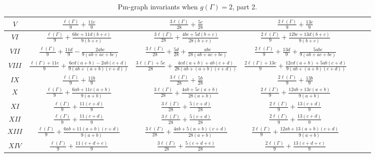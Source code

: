\documentclass[12pt]{amsart}
\theoremstyle{example}
\theoremstyle{definition}
\theoremstyle{notation}
\begin{document}
\begin{table}
\begin{center}
\begin{tabular}{|c|c|c|c|c|c|c|}
 \hline
$V$ {\rule{0pt}{2.6ex}} {\rule[-1.2ex]{0pt}{0ex}} &  $\frac{\ell ({\Gamma})}{9}+\frac{11c}{9}$ & $\frac{3{\ell ({\Gamma})}}{28}+\frac{5c}{28}$ & $\frac{2{\ell ({\Gamma})}}{9}+\frac{13c}{9}$ \\
 \hline
 $VI$ {\rule{0pt}{2.6ex}} {\rule[-1.2ex]{0pt}{0ex}} &  $\frac{\ell ({\Gamma})}{9}+\frac{6bc+11d(b+c)}{9(b+c)}$ & $\frac{3{\ell ({\Gamma})}}{28}+\frac{4bc+5d(b+c)}{28(b+c)}$ & $\frac{2{\ell ({\Gamma})}}{9}+\frac{12bc+13d(b+c)}{9(b+c)}$ \\
 \hline
$VII$ {\rule{0pt}{2.6ex}} {\rule[-1.2ex]{0pt}{0ex}} &  $\frac{\ell ({\Gamma})}{9}+\frac{11d}{9}-\frac{2a b c}{9(ab+ac+bc)}$ & $\frac{3{\ell ({\Gamma})}}{28}+\frac{5d}{28}+\frac{a b c}{28(ab+ac+bc)}$ & $\frac{2{\ell ({\Gamma})}}{9}+\frac{13d}{9}+\frac{5a b c}{9(ab+ac+bc)}$  \\
 \hline
\small{$VIII$} {\rule{0pt}{2.6ex}} {\rule[-1.2ex]{0pt}{0ex}} &
$\frac{{\ell ({\Gamma})}+11e}{9}+\frac{6cd(a+b)-2a b (c+d)}{9(ab+(a+b)(c+d))}$ &
 $\frac{3{\ell ({\Gamma})}+5e}{28}+\frac{4cd(a+b)+a b (c+d)}{28(ab+(a+b)(c+d))}$ & $\frac{2{\ell ({\Gamma})}+13e}{9}+\frac{12cd(a+b)+5a b (c+d)}{9(ab+(a+b)(c+d))}$  \\
 \hline
 $IX$ {\rule{0pt}{2.6ex}} {\rule[-1.2ex]{0pt}{0ex}} &  $\frac{\ell ({\Gamma})}{9}+\frac{11b}{9}$ & $\frac{3{\ell ({\Gamma})}}{28}+\frac{5b}{28}$ & $\frac{2{\ell ({\Gamma})}}{9}+\frac{13b}{9}$  \\
 \hline
 $X$ {\rule{0pt}{2.6ex}} {\rule[-1.2ex]{0pt}{0ex}} &  $\frac{\ell ({\Gamma})}{9}+\frac{6ab+11c(a+b)}{9(a+b)}$ & $\frac{3{\ell ({\Gamma})}}{28}+\frac{4ab+5c(a+b)}{28(a+b)}$ & $\frac{2{\ell ({\Gamma})}}{9}+\frac{12ab+13c(a+b)}{9(a+b)}$  \\
 \hline
$XI$ {\rule{0pt}{2.6ex}} {\rule[-1.2ex]{0pt}{0ex}} &  $\frac{\ell ({\Gamma})}{9}+\frac{11(c+d)}{9}$ & $\frac{3{\ell ({\Gamma})}}{28}+\frac{5(c+d)}{28}$ & $\frac{2{\ell ({\Gamma})}}{9}+\frac{13(c+d)}{9}$  \\
 \hline
$XII$ {\rule{0pt}{2.6ex}} {\rule[-1.2ex]{0pt}{0ex}} &  $\frac{\ell ({\Gamma})}{9}+\frac{11(c+d)}{9}$ & $\frac{3{\ell ({\Gamma})}}{28}+\frac{5(c+d)}{28}$ & $\frac{2{\ell ({\Gamma})}}{9}+\frac{13(c+d)}{9}$  \\
 \hline
 \small{$XIII$} {\rule{0pt}{2.6ex}} {\rule[-1.2ex]{0pt}{0ex}} &  $\frac{\ell ({\Gamma})}{9}+\frac{6ab+11(a+b)(c+d)}{9(a+b)}$ &
 $\frac{3{\ell ({\Gamma})}}{28}+\frac{4ab+5(a+b)(c+d)}{28(a+b)}$ & $\frac{2{\ell ({\Gamma})}}{9}+\frac{12ab+13(a+b)(c+d)}{9(a+b)}$  \\
 \hline
 \small{$XIV$} {\rule{0pt}{2.6ex}} {\rule[-1.2ex]{0pt}{0ex}} &  $\frac{\ell ({\Gamma})}{9}+\frac{11(c+d+e)}{9}$ & $\frac{3{\ell ({\Gamma})}}{28}+\frac{5(c+d+e)}{28}$ & $\frac{2{\ell ({\Gamma})}}{9}+\frac{13(c+d+e)}{9}$  \\
 \hline
\end{tabular}
\end{center}  \caption{Pm-graph invariants when $g({\Gamma})=2$, part 2.} \label{tab caseIIIb}
\end{table}
\end{document}

